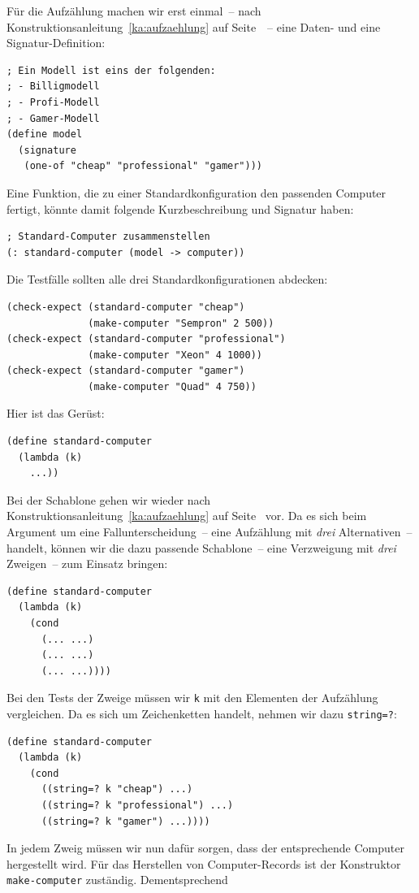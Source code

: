 Für die Aufzählung machen wir erst einmal~-- nach
Konstruktionsanleitung~\ref{ka:aufzaehlung} auf
Seite~\pageref{ka:aufzaehlung}~-- eine Daten- und eine
Signatur-Definition:
%
\begin{verbatim}
; Ein Modell ist eins der folgenden:
; - Billigmodell
; - Profi-Modell
; - Gamer-Modell
(define model
  (signature
   (one-of "cheap" "professional" "gamer")))
\end{verbatim}
%
Eine Funktion, die zu einer Standardkonfiguration den passenden
Computer fertigt, könnte damit folgende Kurzbeschreibung und Signatur haben:
%
\begin{verbatim}
; Standard-Computer zusammenstellen
(: standard-computer (model -> computer))
\end{verbatim}
%
Die Testfälle sollten alle drei Standardkonfigurationen abdecken:
%
\begin{verbatim}
(check-expect (standard-computer "cheap")
              (make-computer "Sempron" 2 500))
(check-expect (standard-computer "professional")
              (make-computer "Xeon" 4 1000))
(check-expect (standard-computer "gamer")
              (make-computer "Quad" 4 750))
\end{verbatim}
%
Hier ist das Gerüst:
%
\begin{verbatim}
(define standard-computer
  (lambda (k)
    ...))
\end{verbatim}
%
Bei der Schablone gehen wir wieder nach Konstruktionsanleitung~\ref{ka:aufzaehlung} auf
Seite~\pageref{ka:aufzaehlung} vor.
Da es sich beim Argument um eine Fallunterscheidung~-- eine Aufzählung
mit \emph{drei} Alternativen~-- handelt, können wir die
dazu passende Schablone~-- eine Verzweigung mit \emph{drei} Zweigen~--
zum Einsatz bringen:
%
\begin{verbatim}
(define standard-computer
  (lambda (k)
    (cond
      (... ...)
      (... ...)
      (... ...))))
\end{verbatim}
%
Bei den Tests der Zweige müssen wir \texttt{k} mit den Elementen der
Aufzählung vergleichen.  Da es sich um Zeichenketten handelt, nehmen
wir dazu \texttt{string=?}:
%
\begin{verbatim}
(define standard-computer
  (lambda (k)
    (cond
      ((string=? k "cheap") ...)
      ((string=? k "professional") ...)
      ((string=? k "gamer") ...))))
\end{verbatim}
%
In jedem Zweig müssen wir nun dafür sorgen, dass der entsprechende
Computer hergestellt wird.  Für das Herstellen von Computer-Records
ist der Konstruktor \texttt{make-computer} zuständig.  Dementsprechend
